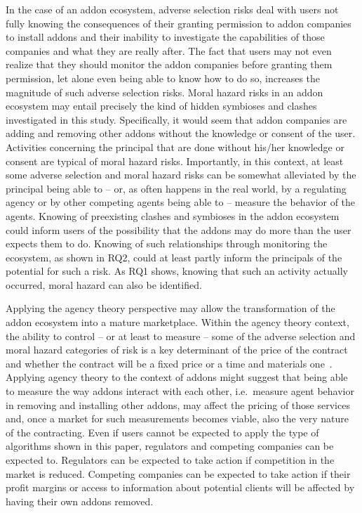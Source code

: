 \documentclass[10pt,letterpaper]{article}
\begin{document}
In the case of an addon ecosystem, adverse selection risks deal with users not fully knowing the consequences of their granting permission to addon companies to install addons and their inability to investigate the capabilities of those companies and what they are really after. The fact that users may not even realize that they should monitor the addon companies before granting them permission, let alone even being able to know how to do so, increases the magnitude of such adverse selection risks. Moral hazard risks in an addon ecosystem may entail precisely the kind of hidden symbioses and clashes investigated in this study. Specifically, it would seem that addon companies are adding and removing other addons without the knowledge or consent of the user. Activities concerning the principal that are done without his/her knowledge or consent are typical of moral hazard risks. Importantly, in this context, at least some adverse selection and moral hazard risks can be somewhat alleviated by the principal being able to -- or, as often happens in the real world, by a regulating agency or by other competing agents being able to -- measure the behavior of the agents. Knowing of preexisting clashes and symbioses in the addon ecosystem could inform users of the possibility that the addons may do more than the user expects them to do. Knowing of such relationships through monitoring the ecosystem, as shown in RQ2, could at least partly inform the principals of the potential for such a risk. As RQ1 shows, knowing that such an activity actually occurred, moral hazard can also be identified. 

Applying the agency theory perspective may allow the transformation of the addon ecosystem into a mature marketplace. Within the agency theory context, the ability to control -- or at least to measure -- some of the adverse selection and moral hazard categories of risk is a key determinant of the price of the contract and whether the contract will be a fixed price or a time and materials one~\cite{gefen2008business}. Applying agency theory to the context of addons might suggest that being able to measure the way addons interact with each other, i.e.~measure agent behavior in removing and installing other addons, may affect the pricing of those services and, once a market for such measurements becomes viable, also the very nature of the contracting.  Even if users cannot be expected to apply the type of algorithms shown in this paper, regulators and competing companies can be expected to. Regulators can be expected to take action if competition in the market is reduced. Competing companies can be expected to take action if their profit margins or access to information about potential clients will be affected by having their own addons removed. 
\end{document}
